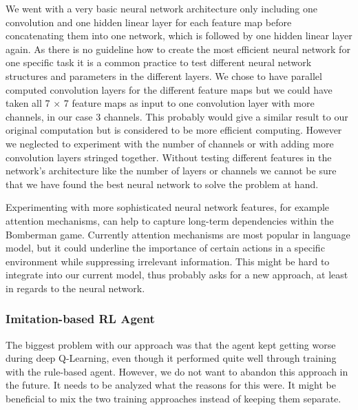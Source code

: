 We went with a very basic neural network architecture only including one convolution and one hidden linear layer for each feature map before concatenating them into one network, which is followed by one hidden linear layer again. As there is no guideline how to create the most efficient neural network for one specific task it is a common practice to test different neural network structures and parameters in the different layers. We chose to have parallel computed convolution layers for the different feature maps but we could have taken all 7 $\times$ 7 feature maps as input to one convolution layer with more channels, in our case 3 channels. This probably would give a similar result to our original computation but is considered to be more efficient computing. However we neglected to experiment with the number of channels or with adding more convolution layers stringed together. Without testing different features in the network's architecture like the number of layers or channels we cannot be sure that we have found the best neural network to solve the problem at hand.

Experimenting with more sophisticated neural network features, for example attention mechanisms, can help to capture long-term dependencies within the Bomberman game. Currently attention mechanisms are most popular in language model, but it could underline the importance of certain actions in a specific environment while suppressing irrelevant information. This might be hard to integrate into our current model, thus probably asks for a new approach, at least in regards to the neural network.




\subsubsection{Imitation-based RL Agent}

The biggest problem with our approach was that the agent kept getting worse during deep Q-Learning, 
even though it performed quite well through training with the rule-based agent. However, we do not want 
to abandon this approach in the future. It needs to be analyzed what the reasons for this were.
It might be beneficial to mix the two training approaches instead of keeping them separate.